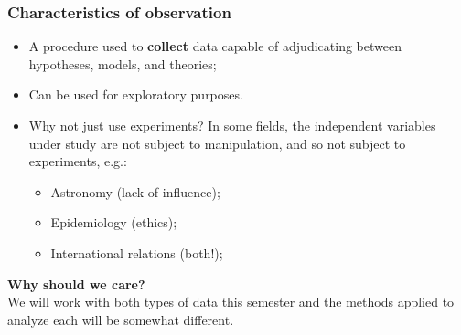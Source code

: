 \documentclass[aspectratio=169]{beamer}
\theoremstyle{principle}
\begin{document}
\begin{frame}
\frametitle{Characteristics of observation}

\begin{itemize}
\item A procedure used to \textbf{collect} data capable of adjudicating between hypotheses, models, and theories;
\bigskip
\bigskip

\item Can be used for exploratory purposes.
\bigskip
\bigskip

\item Why not just use experiments?  In some fields, the independent variables under study are not subject to manipulation, and so not subject to experiments, e.g.:
\begin{itemize}
\item Astronomy (lack of influence);
\item Epidemiology (ethics);
\item International relations (both!);
\end{itemize}

\end{itemize}

\end{frame}

%
%

\begin{frame}

\begin{center}
\Huge\textbf{Why should we care?}\\
\bigskip
\bigskip
\large We will work with both types of data this semester and the methods applied to analyze each will be somewhat different.\\
\end{center}

\end{frame}
\end{document}
